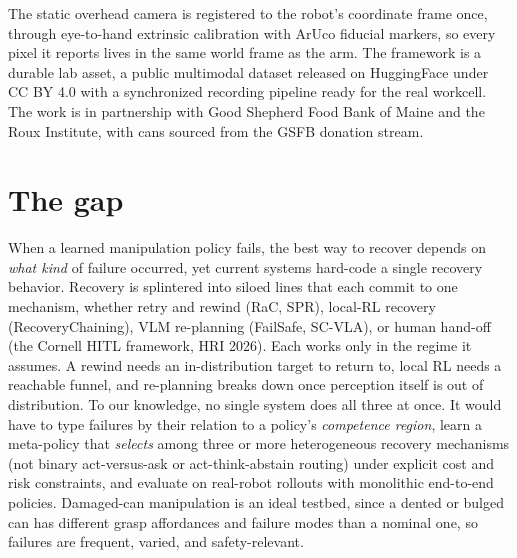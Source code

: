 \documentclass[11pt]{article}
\begin{document}
The static overhead camera is registered to the robot's coordinate frame once, through eye-to-hand extrinsic calibration with ArUco fiducial markers, so every pixel it reports lives in the same world frame as the arm. The framework is a durable lab asset, a public multimodal dataset released on HuggingFace under CC BY 4.0 with a synchronized recording pipeline ready for the real workcell. The work is in partnership with Good Shepherd Food Bank of Maine and the Roux Institute, with cans sourced from the GSFB donation stream.

\section{The gap}
When a learned manipulation policy fails, the best way to recover depends on \emph{what kind} of failure occurred, yet current systems hard-code a single recovery behavior. Recovery is splintered into siloed lines that each commit to one mechanism, whether retry and rewind (RaC, SPR), local-RL recovery (RecoveryChaining), VLM re-planning (FailSafe, SC-VLA), or human hand-off (the Cornell HITL framework, HRI 2026). Each works only in the regime it assumes. A rewind needs an in-distribution target to return to, local RL needs a reachable funnel, and re-planning breaks down once perception itself is out of distribution. To our knowledge, no single system does all three at once. It would have to type failures by their relation to a policy's \emph{competence region}, learn a meta-policy that \emph{selects} among three or more heterogeneous recovery mechanisms (not binary act-versus-ask or act-think-abstain routing) under explicit cost and risk constraints, and evaluate on real-robot rollouts with monolithic end-to-end policies. Damaged-can manipulation is an ideal testbed, since a dented or bulged can has different grasp affordances and failure modes than a nominal one, so failures are frequent, varied, and safety-relevant.
\end{document}
